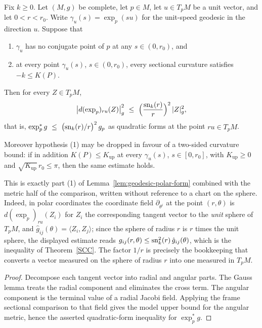 \begin{lemma}
\label{lem:exp-pullback-metric-comparison}





Fix $k\ge0$. Let $(M,g)$ be complete, let $p\in M$, let $u\in T_pM$ be a unit
vector, and let $0<r<r_0$. Write $\gamma_u(s)=\exp_p(su)$ for the unit-speed
geodesic in the direction $u$. Suppose that
\begin{enumerate}
\item $\gamma_u$ has no conjugate point of $p$ at any $s\in(0,r_0)$, and
\item at every point $\gamma_u(s)$, $s\in(0,r_0)$, every sectional curvature
satisfies $-k\le K(P)$.
\end{enumerate}
Then for every $Z\in T_pM$,
$$\bigl|d(\operatorname{exp}_p)_{ru}(Z)\bigr|_g^2\ \le\
\Bigl(\frac{\operatorname{sn}_{k}(r)}{r}\Bigr)^{2}\,|Z|_g^2,$$
that is, $\exp_p^{*}g\ \le\ \bigl(\sn_{k}(r)/r\bigr)^{2}\,g_p$ as quadratic
forms at the point $ru\in T_pM$.

Moreover hypothesis (1) may be dropped in favour of a two-sided curvature
bound: if in addition $K(P)\le K_{\mathrm{up}}$ at every $\gamma_u(s)$,
$s\in[0,r_0]$, with $K_{\mathrm{up}}\ge0$ and
$\sqrt{K_{\mathrm{up}}}\,r_0\le\pi$, then the same estimate holds.
\end{lemma}

This is exactly part (1) of Lemma~\ref{lem:geodesic-polar-form} combined with
the metric half of the comparison, written without reference to a chart on the
sphere. Indeed, in polar coordinates the coordinate field
$\partial_{\theta^i}$ at the point $(r,\theta)$ is $d(\exp_p)_{ru}(Z_i)$ for
$Z_i$ the corresponding tangent vector to the \emph{unit} sphere of $T_pM$, and
$\hat g_{ij}(\theta)=\langle Z_i,Z_j\rangle$; since the sphere of radius $r$ is
$r$ times the unit sphere, the displayed estimate reads
$g_{ij}(r,\theta)\le\operatorname{sn}_k^2(r)\,\hat g_{ij}(\theta)$, which is the inequality
of Theorem~\ref{SCC}. The factor $1/r$ is precisely the bookkeeping that
converts a vector measured on the sphere of radius $r$ into one measured in
$T_pM$.

\begin{proof}
\sketch
{}

Decompose each tangent vector into radial and angular parts. The Gauss lemma treats the radial component and eliminates the cross term. The angular component is the terminal value of a radial Jacobi field. Applying the frame sectional comparison to that field gives the model upper bound for the angular metric, hence the asserted quadratic-form inequality for $\exp_p^*g$.
\end{proof}


